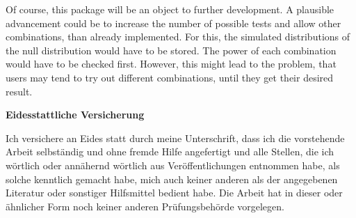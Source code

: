\documentclass[12pt,a4paper]{article}
\begin{document}
Of course, this package will be an object to further development. A
plausible advancement could be to increase the number of possible tests
and allow other combinations, than already implemented. For this, the
simulated distributions of the null distribution would have to be
stored. The power of each combination would have to be checked first.
However, this might lead to the problem, that users may tend to try out
different combinations, until they get their desired result.

\newpage
\renewcommand*{\mkbibnamefamily}[1]{\textbf{#1}}
\renewcommand*{\mkbibnamegiven}[1]{\textbf{#1}}
\renewcommand*{\mkbibnameprefix}[1]{\textbf{#1}}
\renewcommand*{\mkbibnamesuffix}[1]{\textbf{#1}}
\printbibliography[title=References]

\newpage
\textbf{Eidesstattliche Versicherung}

\bigskip

Ich versichere an Eides statt durch meine Unterschrift, dass ich die vorstehende Arbeit selbständig und ohne fremde Hilfe angefertigt und alle Stellen, die ich wörtlich oder annähernd wörtlich aus Veröffentlichungen entnommen habe, als solche kenntlich gemacht habe, mich auch keiner anderen als der angegebenen Literatur oder sonstiger Hilfsmittel bedient habe. Die Arbeit hat in dieser oder ähnlicher Form noch keiner anderen Prüfungsbehörde vorgelegen.

\vspace{1cm}
\rule{0pt}{2\baselineskip} %
\par\noindent{} \hfill\makebox[2.25in]{\hrulefill}%
\par\noindent\makebox[2.25in][l]{} \hfill{}%
\end{document}
